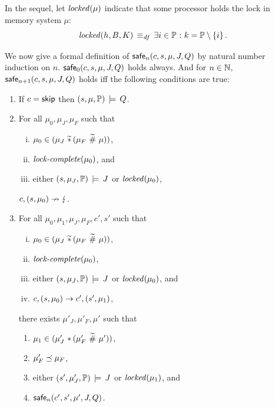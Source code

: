 \documentclass[11pt]{report}
\begin{document}
In the sequel, let $\mathit{locked}(\mu)$ indicate that some processor holds the lock in memory system $\mu$: \[ \mathit{locked}(h,B,K) \operatorname{\;\equiv_{\mathit{df}}\;} \exists i \in \mathbb{P} \operatorname{\,:\,} k = \mathbb{P} \setminus \left\lbrace i \right\rbrace. \]

We now give a formal definition of $\mathsf{safe}_{n}(c,s,\mu,J,Q)$ by natural number induction on $n$. $\mathsf{safe}_{0}(c,s,\mu,J,Q)$ holds always. And for $n \in \mathbb{N}$, $\mathsf{safe}_{n+1}(c,s,\mu,J,Q)$ holds iff the following conditions are true: \begin{enumerate}
  \item If $c = \operatorname{\mathsf{skip}}$ then $(s,\mu,\mathbb{P}) \,\models\, Q$.

  \item For all $\mu_0,\mu_J,\mu_F$ such that \begin{enumerate}[(i)]
    \item $\mu_0 \in (\mu_J \operatorname{\,\widetilde{\ast}\,} (\mu_F \operatorname{\,\widetilde{\#}\,} \mu))$,
    \item $\text{\textit{lock-complete}}(\mu_0)$, and
    \item either $(s,\mu_J,\mathbb{P}) \,\models\, J$ or $\mathit{locked}(\mu_0)$,
  \end{enumerate} $c,(s,\mu_0) \nrightarrow \lightning$.

  \item For all $\mu_0,\mu_1,\mu_J,\mu_F,c',s'$ such that \begin{enumerate}[(i)]
    \item $\mu_0 \in (\mu_J \operatorname{\,\widetilde{\ast}\,} (\mu_F \operatorname{\,\widetilde{\#}\,} \mu))$,
    \item $\text{\textit{lock-complete}}(\mu_0)$,
    \item either $(s,\mu_J,\mathbb{P}) \,\models\, J$ or $\mathit{locked}(\mu_0)$, and 
    \item $c,(s,\mu_0) \rightarrow c',(s',\mu_1)$,
  \end{enumerate} there exists $\mu'_J,\mu'_F,\mu'$ such that \begin{enumerate}
    \item $\mu_1 \in (\mu'_J \operatorname{\,\ast\,} (\mu'_F \operatorname{\,\widetilde{\#}\,} \mu'))$,
    \item $\mu'_F \preceq \mu_F$,
    \item either $(s',\mu'_J,\mathbb{P}) \,\models\, J$ or $\mathit{locked}(\mu_1)$, and
    \item $\mathsf{safe}_{n}(c',s',\mu',J,Q)$.
  \end{enumerate}

\end{enumerate}
\end{document}
